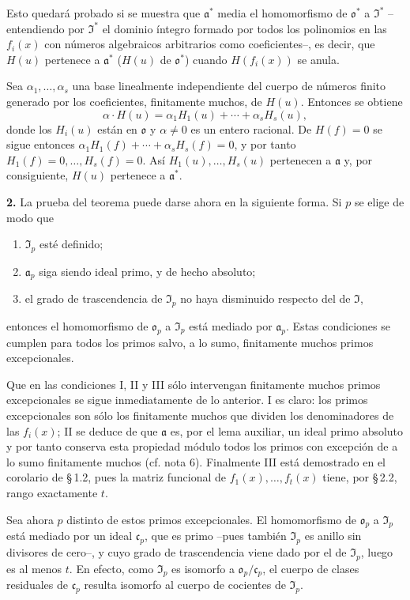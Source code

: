 Esto quedará probado si se muestra que $\mathfrak{a}^*$ media el homomorfismo de $\mathfrak{o}^*$ a $\mathfrak{I}^*$ --entendiendo por $\mathfrak{I}^*$ el dominio íntegro formado por todos los polinomios en las $f_i(x)$ con números algebraicos arbitrarios como coeficientes--, es decir, que $H(u)$ pertenece a $\mathfrak{a}^*$ ($H(u)$ de $\mathfrak{o}^*$) cuando $H(f_i(x))$ se anula.

Sea $\alpha_1,\ldots,\alpha_s$ una base linealmente independiente del cuerpo de números finito generado por los coeficientes, finitamente muchos, de $H(u)$. Entonces se obtiene
\[
\alpha\cdot H(u)=\alpha_1H_1(u)+\cdots+\alpha_sH_s(u),
\]
donde los $H_i(u)$ están en $\mathfrak{o}$ y $\alpha\ne0$ es un entero racional. De $H(f)=0$ se sigue entonces $\alpha_1H_1(f)+\cdots+\alpha_sH_s(f)=0$, y por tanto $H_1(f)=0,\ldots,H_s(f)=0$. Así $H_1(u),\ldots,H_s(u)$ pertenecen a $\mathfrak{a}$ y, por consiguiente, $H(u)$ pertenece a $\mathfrak{a}^*$.

\medskip\noindent\textbf{2.}
La prueba del teorema puede darse ahora en la siguiente forma. Si $p$ se elige de modo que
\begin{enumerate}
\item[I.] $\mathfrak{I}_p$ esté definido;
\item[II.] $\mathfrak{a}_p$ siga siendo ideal primo, y de hecho absoluto;
\item[III.] el grado de trascendencia de $\mathfrak{I}_p$ no haya disminuido respecto del de $\mathfrak{I}$,
\end{enumerate}
entonces el homomorfismo de $\mathfrak{o}_p$ a $\mathfrak{I}_p$ está mediado por $\mathfrak{a}_p$. Estas condiciones se cumplen para todos los primos salvo, a lo sumo, finitamente muchos primos excepcionales.

Que en las condiciones I, II y III sólo intervengan finitamente muchos primos excepcionales se sigue inmediatamente de lo anterior. I es claro: los primos excepcionales son sólo los finitamente muchos que dividen los denominadores de las $f_i(x)$; II se deduce de que $\mathfrak{a}$ es, por el lema auxiliar, un ideal primo absoluto y por tanto conserva esta propiedad módulo todos los primos con excepción de a lo sumo finitamente muchos (cf. nota 6). Finalmente III está demostrado en el corolario de \S\,1.2, pues la matriz funcional de $f_1(x),\ldots,f_t(x)$ tiene, por \S\,2.2, rango exactamente $t$.

Sea ahora $p$ distinto de estos primos excepcionales. El homomorfismo de $\mathfrak{o}_p$ a $\mathfrak{I}_p$ está mediado por un ideal $\mathfrak{c}_p$, que es primo --pues también $\mathfrak{I}_p$ es anillo sin divisores de cero--, y cuyo grado de trascendencia viene dado por el de $\mathfrak{I}_p$, luego es al menos $t$. En efecto, como $\mathfrak{I}_p$ es isomorfo a $\mathfrak{o}_p/\mathfrak{c}_p$, el cuerpo de clases residuales de $\mathfrak{c}_p$ resulta isomorfo al cuerpo de cocientes de $\mathfrak{I}_p$.

